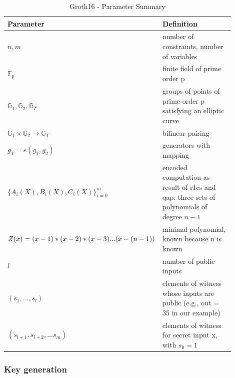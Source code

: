 \setlength{\tabcolsep}{2ex}
\renewcommand{\arraystretch}{1.5}%
\begin{table}[hbt]
	\centering
	    \caption{Groth16 - Parameter Summary}
		\begin{tabular}{| m{0.3\linewidth} | m{0.6\linewidth} |}
		\hline
		\textbf{Parameter} & \textbf{Definition}\\ \hline
            \(n,m\) & number of constraints, number of variables\\ \hline
            \begin{math}\mathbb{F}_p\end{math} & finite field of prime order p\\ \hline 
            \begin{math}\mathbb{G}_1, \mathbb{G}_2, \mathbb{G}_T\end{math} & groups of points of prime order p satisfying an elliptic curve\\ \hline
            \begin{math}\mathbb{G}_1 \times \mathbb{G}_2 \to \mathbb{G}_T\end{math}& bilinear pairing \\ \hline
            \begin{math}g_T = e(g_1, g_2)\end{math}& generators with mapping \\\hline
            \begin{math}\bigl\{A_i(X), B_i(X), C_i(X)\bigl\}_{i=0}^m\end{math} & encoded computation as result of \acrshort{r1cs} and \acrshort{qap}: three sets of polynomials of degree \(n-1\)\\ \hline
            \(Z(x) = (x-1)*(x-2) * \newline (x-3)...(x-(n-1))\) &  minimal polynomial, known because n is known \\ \hline
            \(l\) & number of public inputs \\ \hline
            \((s_1,...,s_l)\) & elements of witness whose inputs are public \newline (e.g., out = 35 in our example) \\ \hline
            \((s_{l+1},s_{l+2},...s_m)\) & elements of witness for secret input x, with \(s_0 = 1\) \\ \hline
	\end{tabular}
\label{tab:Groth16Params}
\end{table}

\subsubsection{Key generation}

